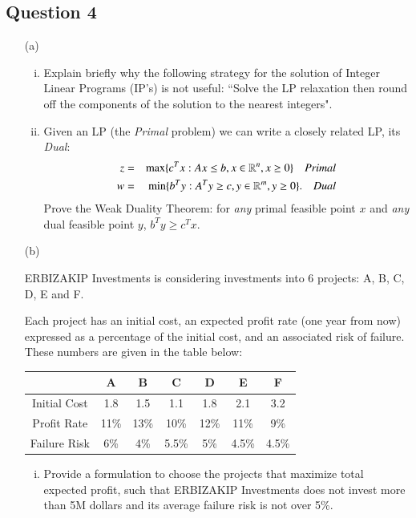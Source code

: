 \documentclass[12pt]{article}
\begin{document}
		\subsection*{Question 4}
		\begin{itemize}
			\item[(a)] 
\begin{enumerate}[(i)]
\item Explain briefly why the following strategy for the solution of Integer
Linear Programs (IP’s) is not useful: ``Solve the LP relaxation
then round off the components of the solution to the nearest integers". 
\item Given an LP (the \emph{Primal} problem) we can write a closely related LP, its \emph{Dual}:
\begin{eqnarray*}
										z &=& \max\{c^T x : Ax \le b,  x \in \mathbb{R}^n, x \ge 0 \}\quad \emph{Primal}\label{eq:lp-primal-1}\\
										w&=&    \min \{b^T  y : A^T y  \ge c,  y \in \mathbb{R}^m, y  \ge 0\}. \quad\emph{Dual}\label{eq:lp-dual-1}
\end{eqnarray*}
Prove the Weak Duality Theorem: for \emph{any} primal feasible
point $x$ and \emph{any} dual feasible point $y$, $ b^T y \ge c^T x$.
\end{enumerate}	
			\item[(b)] 
			
			ERBIZAKIP Investments is considering investments into 6 projects: A, B, C, D, E and F.
			
			Each project has an initial cost, an expected profit rate (one year from now) expressed as a
			percentage of the initial cost, and an associated risk of failure.
			These numbers are given in the table below:
			
			\begin{center}
			\begin{tabular}{|c||c|c|c|c|c|c|}
				\hline  & A & B & C & D & E & F \\ 
				\hline Initial Cost & 1.8 & 1.5 & 1.1 & 1.8 & 2.1 & 3.2 \\ 
				\hline Profit Rate & 11\% & 13\% & 10\% & 12\% & 11\% & 9\% \\ 
				\hline Failure Risk & 6\% & 4\% & 5.5\% & 5\% & 4.5\%  & 4.5\%\\ 
				\hline 
			\end{tabular} 
		\end{center}
			\begin{enumerate}[(i)] \item  Provide a formulation to choose the projects that maximize total
				expected profit, such that ERBIZAKIP Investments does not invest more than
				5M dollars and its average failure risk is not over 5\%. 
				

\end{enumerate}
\end{itemize}
\end{document}
